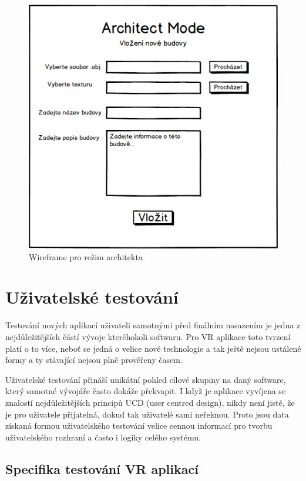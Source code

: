 \documentclass[thesis=B,czech]{FITthesis}[2012/06/26]
\begin{document}
\begin{figure}
  		\includegraphics[width=\textwidth,height=\textheight,keepaspectratio]{ArchitectMock.png}
  		\caption{Wireframe pro režim architekta}
  		\label{fig:ArchitectMock}
	\end{figure}
	
	\section{Uživatelské testování}
	
	Testování nových aplikací uživateli samotnými před finálním nasazením je jedna z nejdůležitějších částí vývoje kteréhokoli softwaru. Pro VR aplikace toto tvrzení platí o to více, neboť se jedná o velice nové technologie a tak ještě nejsou ustálené formy a ty stávající nejsou plně prověřeny časem.
	
	 Uživatelské testování přináší unikátní pohled cílové skupiny na daný software, který samotné vývojáře často dokáže překvapit. I když je aplikace vyvíjena se znalostí nejdůležitějších principů UCD (user centred design), nikdy není jisté, že je pro uživatele přijatelná, dokud tak uživatelé sami neřeknou. Proto jsou data získaná formou uživatelského testování velice cennou informací pro tvorbu uživatelského rozhraní a často i logiky celého systému.
	
	\subsection{Specifika testování VR aplikací}
	
\end{document}
